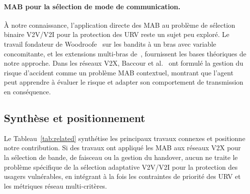 \documentclass[12pt,a4paper]{article}
\begin{document}
\paragraph{MAB pour la sélection de mode de communication.}
À notre connaissance, l'application directe des MAB au problème de sélection
binaire V2V/V2I pour la protection des URV reste un sujet peu exploré. Le travail
fondateur de Woodroofe~\cite{woodroofe1979} sur les bandits à un bras avec variable
concomitante, et les extensions multi-bras de~\cite{anantharam2003}, fournissent
les bases théoriques de notre approche. Dans les réseaux V2X, Baccour et
al.~\cite{mab_v2x_risk} ont formulé la gestion du risque d'accident comme un
problème MAB contextuel, montrant que l'agent peut apprendre à évaluer le risque
et adapter son comportement de transmission en conséquence.

\subsection{Synthèse et positionnement}

Le Tableau~\ref{tab:related} synthétise les principaux travaux connexes et positionne
notre contribution. Si des travaux ont appliqué les MAB aux réseaux V2X pour la
sélection de bande, de faisceau ou la gestion du handover, aucun ne traite le
problème spécifique de la sélection adaptative V2V/V2I pour la protection des
usagers vulnérables, en intégrant à la fois les contraintes de priorité des URV
et les métriques réseau multi-critères.

\begin{table}[H]
\centering
\caption{Comparaison des travaux connexes}
\label{tab:related}
\end{table}
\end{document}
